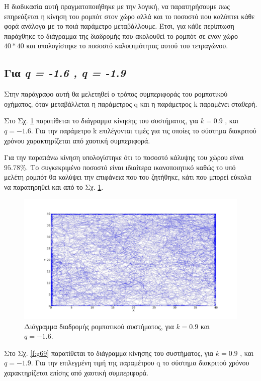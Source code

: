 Η διαδικασία αυτή πραγματοποιήθηκε με την λογική, να παρατηρήσουμε πως επηρεάζεται η κίνηση του ρομπότ στον χώρο αλλά και το ποσοστό που καλύπτει κάθε φορά ανάλογα με το ποιά παράμετρο μεταβάλλουμε. 
Έτσι, για κάθε περίπτωση παράχθηκε το διάγραμμα της διαδρομής που ακολουθεί το ρομπότ σε εναν χώρο $40*40$ και υπολογίστηκε το ποσοστό καλυψιμότητας αυτού του τετραγώνου.
\clearpage
\subsection{Για \emph{q = -1.6 , q = -1.9}}

Στην παράγραφο αυτή θα μελετηθεί ο τρόπος συμπεριφοράς του ρομποτικού οχήματος, όταν μεταβάλλεται η παράμετρος q και η παράμετρος k παραμένει σταθερή.

Στο Σχ. \ref{f:g68} παρατίθεται το διάγραμμα κίνησης του συστήματος, για $k=0.9$ , και $q = -1.6$. Για την παράμετρο k επιλέγονται τιμές για τις οποίες το σύστημα διακριτού χρόνου χαρακτηρίζεται από χαοτική συμπεριφορά.

Για την παραπάνω κίνηση υπολογίστηκε ότι το ποσοστό κάλυψης του χώρου είναι
$95.78 \% $. Το συγκεκριμένο ποσοστό είναι ιδιαίτερα ικανοποιητικό καθώς το υπό μελέτη ρομπότ θα καλύψει την επιφάνεια που του ζητήθηκε, κάτι που μπορεί εύκολα να παρατηρηθεί και από το Σχ. \ref{f:g68}.

\begin{figure}[ht]
	\centering
	\includegraphics[width=1\linewidth]{LateX images/log/q/g1-1.6}
	\caption{Διάγραμμα διαδρομής ρομποτικού συστήματος, για $k = 0.9$ και $q = -1.6$.}
	\label{f:g68}	
\end{figure}



Στο Σχ. \ref{f:g69} παρατίθεται το διάγραμμα κίνησης του συστήματος, για $k=0.9$ , και $q = -1.9$. Για την επιλεγμένη τιμή της παραμέτρου q το σύστημα διακριτού χρόνου χαρακτηρίζεται επίσης από χαοτική συμπεριφορά.

